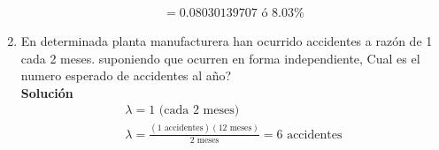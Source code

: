 \begin{enumerate}
\begin{gather*}
    = 0.08030139707 \text{ ó } 8.03\%
    \end{gather*}
    \item En determinada planta manufacturera han ocurrido accidentes a razón de 1 cada 2 meses. suponiendo que ocurren en forma independiente, Cual es el numero esperado de accidentes al año?
    \\\textbf{Solución}
    \\
    \begin{gather*}
    \lambda = 1 \text{ (cada 2 meses)}\\
    \lambda = \frac{(1 \text{ accidentes})(12 \text{ meses})}{2 \text{ meses}} = 6 \text{ accidentes}\\
    \end{gather*}
\end{enumerate}